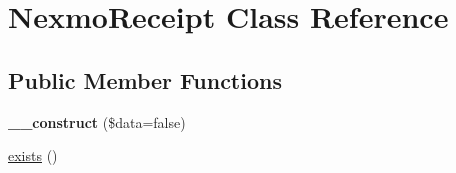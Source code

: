 \hypertarget{class_nexmo_receipt}{\section{Nexmo\-Receipt Class Reference}
\label{class_nexmo_receipt}
}
\subsection*{Public Member Functions}
\begin{DoxyCompactItemize}
\item 
\hypertarget{class_nexmo_receipt_aac83cdb75c38e70c0d41d8dcad2c28d6}{{\bfseries \-\_\-\-\_\-construct} (\$data=false)}\label{class_nexmo_receipt_aac83cdb75c38e70c0d41d8dcad2c28d6}

\item 
\hyperlink{class_nexmo_receipt_ac2f864b72dc2f778e68ad96364c48c5e}{exists} ()
\end{DoxyCompactItemize}
